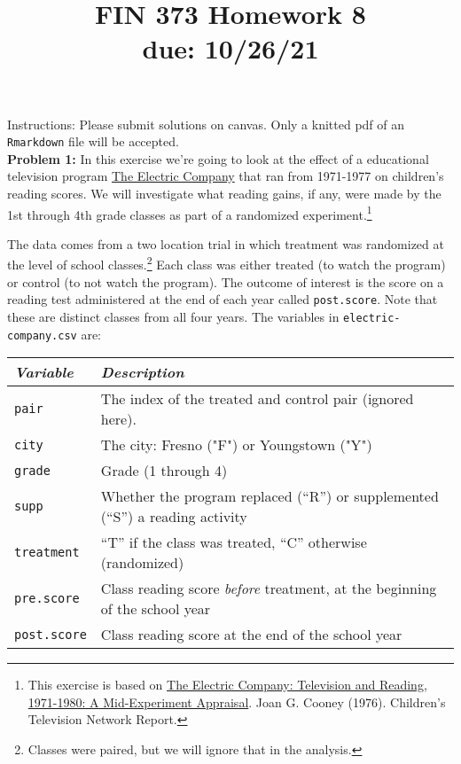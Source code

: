 \documentclass[11pt]{article}
\begin{document}
\title{FIN 373 Homework 8 \\ {\large due: \textbf{10/26/21}}}
\date{}
\maketitle

\vspace{-20mm}

\noindent Instructions: Please submit solutions on canvas.  Only a knitted pdf of an {\tt Rmarkdown} file will be accepted.
\\

\noindent \textbf{Problem 1:} In this exercise we're going to look at the effect 
of a educational television program 
\href{https://en.wikipedia.org/wiki/The_Electric_Company}{The Electric Company}
that ran from 1971-1977 on children's reading scores.  We will investigate what reading gains, if any, were made by the 1st through 4th grade classes as part of a randomized experiment.\footnote{This exercise is based on \href{https://files.eric.ed.gov/fulltext/ED130635.pdf}{The Electric Company: Television and Reading, 1971-1980: A Mid-Experiment Appraisal}. Joan G. Cooney (1976). Children's Television Network Report.}

The data comes from a two location trial in which 
treatment was randomized at the level of school classes.\footnote{Classes were 
paired, but we will ignore that in the analysis.} Each class was 
either treated (to watch the program) or control (to not watch the 
program). The outcome of interest is the score on a reading test 
administered at the end of each year called {\tt post.score}. Note that 
these are distinct classes from all four years.  The variables in {\tt electric-company.csv} are:



\vspace{3mm}
\begin{center}
\begin{tabular}{l p{}}
 \hline
\textit{Variable} & \textit{Description} \\
\hline
{\tt pair} &               The index of the treated and control pair (ignored
                      here). \\
{\tt city} &               The city: Fresno ("F") or Youngstown ("Y") \\
{\tt grade} &              Grade (1 through 4) \\
{\tt supp} &               Whether the program replaced (``R'') or supplemented 
                      (``S'') a reading activity \\
{\tt treatment} &          ``T'' if the class was treated, ``C'' otherwise (randomized) \\
{\tt pre.score} &          Class reading score \textit{before} treatment, at the 
                      beginning of the school year \\
{\tt post.score} &        Class reading score at the end of the school year \\
\hline
\end{tabular}
\end{center}    
\end{document}
